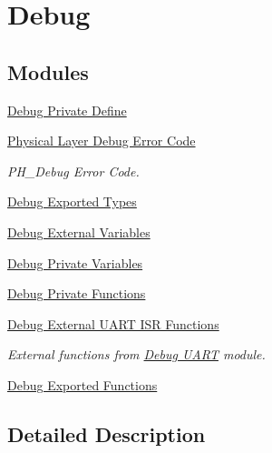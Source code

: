\hypertarget{group___debug}{}\section{Debug}
\label{group___debug}
\subsection*{Modules}
\begin{DoxyCompactItemize}
\item 
\hyperlink{group___debug___private___define}{Debug Private Define}
\item 
\hyperlink{group___p_h___debug___error___code}{Physical Layer Debug Error Code}
\begin{DoxyCompactList}\small\item\em P\+H\+\_\+\+Debug Error Code. \end{DoxyCompactList}\item 
\hyperlink{group___debug___exported___types}{Debug Exported Types}
\item 
\hyperlink{group___debug___external___variables}{Debug External Variables}
\item 
\hyperlink{group___debug___private___variables}{Debug Private Variables}
\item 
\hyperlink{group___debug___private___functions}{Debug Private Functions}
\item 
\hyperlink{group___debug___external___functions}{Debug External U\+A\+R\+T I\+S\+R Functions}
\begin{DoxyCompactList}\small\item\em External functions from \hyperlink{group___debug___uart}{Debug U\+A\+RT} module. \end{DoxyCompactList}\item 
\hyperlink{group___debug___exported___functions}{Debug Exported Functions}
\end{DoxyCompactItemize}


\subsection{Detailed Description}
